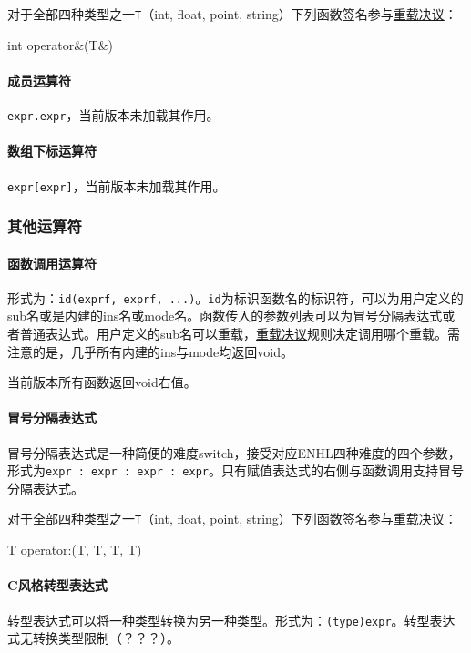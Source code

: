 \documentclass[UTF8]{ctexart}
\begin{document}
对于全部四种类型之一\verb|T|（int, float, point, string）下列函数签名参与\hyperref[chongzai]{重载决议}：
\begin{MUAvbt}
int operator&(T&)
\end{MUAvbt}

\paragraph{成员运算符} \verb|expr.expr|，当前版本未加载其作用。

\paragraph{数组下标运算符} \verb|expr[expr]|，当前版本未加载其作用。

\subsubsection{其他运算符}
\label{qita}

\paragraph{函数调用运算符} 形式为：\verb|id(exprf, exprf, ...)|。\verb|id|为标识函数名的标识符，可以为用户定义的sub名或是内建的ins名或mode名。函数传入的参数列表可以为冒号分隔表达式或者普通表达式。用户定义的sub名可以重载，\hyperref[chongzai]{重载决议}规则决定调用哪个重载。需注意的是，几乎所有内建的ins与mode均返回void。

当前版本所有函数返回void右值。

\paragraph{冒号分隔表达式} 冒号分隔表达式是一种简便的难度switch，接受对应ENHL四种难度的四个参数，形式为\verb|expr : expr : expr : expr|。只有赋值表达式的右侧与函数调用支持冒号分隔表达式。

对于全部四种类型之一\verb|T|（int, float, point, string）下列函数签名参与\hyperref[chongzai]{重载决议}：
\begin{MUAvbt}
T operator:(T, T, T, T)
\end{MUAvbt}

\paragraph{C风格转型表达式} 转型表达式可以将一种类型转换为另一种类型。形式为：\verb|(type)expr|。转型表达式无转换类型限制（？？？）。
\end{document}

